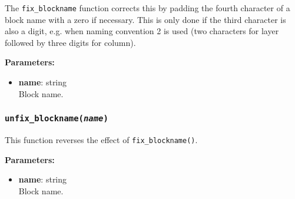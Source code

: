 The \texttt{fix\_blockname} function corrects this by padding the fourth character of a block name with a zero if necessary.  This is only done if the third character is also a digit, e.g. when naming convention 2 is used (two characters for layer followed by three digits for column).

\textbf{Parameters:}
\begin{itemize}
\item \textbf{name}: string\\
  Block name.
\end{itemize}

\begin{snugshade}
\subsubsection{\texttt{unfix\_blockname(\emph{name})}}
\end{snugshade}

This function reverses the effect of \texttt{fix\_blockname()}.

\textbf{Parameters:}
\begin{itemize}
\item \textbf{name}: string\\
  Block name.
\end{itemize}

